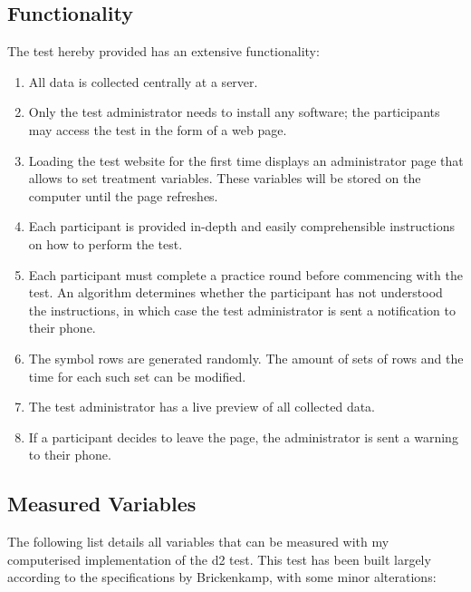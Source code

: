 \documentclass[a4paper,11pt,british,oneside]{article}
\begin{document}
\subsection{Functionality}
The test hereby provided has an extensive functionality:
\begin{enumerate}
	\item All data is collected centrally at a server.
	\item Only the test administrator needs to install any software; the participants may access the test in the form of a web page.
	\item Loading the test website for the first time displays an administrator page that allows to set treatment variables. These variables will be stored on the computer until the page refreshes.
	\item Each participant is provided in-depth and easily comprehensible instructions on how to perform the test.
	\item Each participant must complete a practice round before commencing with the test. An algorithm determines whether the participant has not understood the instructions, in which case the test administrator is sent a notification to their phone.
	\item The symbol rows are generated randomly. The amount of sets of rows and the time for each such set can be modified.
	\item The test administrator has a live preview of all collected data.
	\item If a participant decides to leave the page, the administrator is sent a warning to their phone.
\end{enumerate}

\subsection{Measured Variables}\label{sec:vars}

The following list details all variables that can be measured with my computerised implementation of the d2 test. This test has been built largely according to the specifications by Brickenkamp, with some minor alterations:
\end{document}

